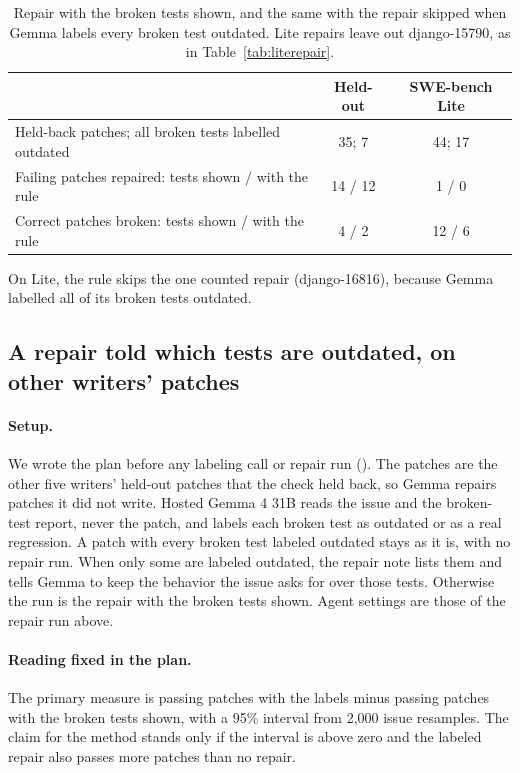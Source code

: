 \documentclass[10pt,letterpaper]{article}
\begin{document}
\begin{table}[H]
\centering
\small
\caption{Repair with the broken tests shown, and the same with the repair skipped when Gemma labels every broken test
outdated. Lite repairs leave out django-15790, as in Table~\ref{tab:literepair}.}
\label{tab:outdated}
\begin{tabular}{@{}lcc@{}}
\toprule
 & Held-out & SWE-bench Lite \\
\midrule
Held-back patches; all broken tests labelled outdated & 35; 7 & 44; 17 \\
Failing patches repaired: tests shown / with the rule & 14 / 12 & 1 / 0 \\
Correct patches broken: tests shown / with the rule & 4 / 2 & 12 / 6 \\
\bottomrule
\end{tabular}
\end{table}

On Lite, the rule skips the one counted repair (django-16816), because Gemma labelled all of its broken tests outdated.

\subsection*{A repair told which tests are outdated, on other writers' patches}

\paragraph{Setup.} We wrote the plan before any labeling call or repair run (). The
patches are the other five writers' held-out patches that the check held back, so Gemma repairs patches it did not
write. Hosted Gemma 4 31B reads the issue and the broken-test report, never the patch, and labels each broken test as
outdated or as a real regression. A patch with every broken test labeled outdated stays as it is, with no repair run.
When only some are labeled outdated, the repair note lists them and tells Gemma to keep the behavior the issue asks for
over those tests. Otherwise the run is the repair with the broken tests shown. Agent settings are those of the repair
run above.

\paragraph{Reading fixed in the plan.} The primary measure is passing patches with the labels minus passing patches
with the broken tests shown, with a 95\% interval from 2,000 issue resamples. The claim for the method stands only if
the interval is above zero and the labeled repair also passes more patches than no repair.
\end{document}
